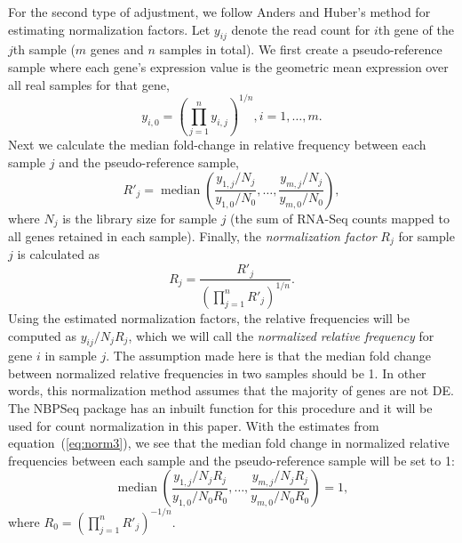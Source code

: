 \documentclass[letterpaper,12pt]{article}
\DeclareMathOperator{\median}{median}
\begin{document}
For the second type of adjustment, we follow Anders and Huber's method
\citep{anders2010differential} for 
estimating normalization factors.  Let $y_{ij}$ denote the read count
for $i$th gene of the $j$th sample ($m$ genes and $n$ samples in total). We first
create a pseudo-reference sample where each gene's expression value is the 
geometric mean expression over all real samples for that gene,
\begin{equation}
y_{i,0} = (\prod_{j=1}^ny_{i,j})^{1/n},  i=1, \ldots, m. 
\end{equation} 
Next we calculate the median fold-change in relative frequency between
each sample $j$ and the pseudo-reference sample,
\begin{equation}\label{eq:normfactors} 
R'_j = \median \left(\dfrac{y_{1,j}/N_j}{y_{1,0}/N_{0}}, \ldots, 
\dfrac{y_{m,j}/N_j}{y_{m,0}/N_{0}}\right),
\end{equation}
where $N_j$ is the library size for sample $j$ (the sum of RNA-Seq
counts mapped to all genes retained in each sample). Finally, the
\textit{normalization factor}  $R_j$ for sample $j$ is calculated as 
\begin{equation}
\label{eq:norm3}
R_j = \dfrac{R'_j}{(\prod_{j=1}^{n}R'_j)^{1/n}}.
\end{equation}
Using the estimated normalization factors, the relative frequencies will be
computed as $y_{ij}/{N_j R_j}$, which we will call the \textit{normalized relative frequency}
for gene $i$ in sample $j$. The assumption made here is that the
median fold change between normalized relative frequencies in two samples should be 1. In
other words, this normalization method assumes that the majority of genes are
not DE. The NBPSeq package \citep{di2014package} has an inbuilt function for
this procedure and it will be used for count normalization in this paper. With
the estimates from equation~(\ref{eq:norm3}), we see that the median fold
change in normalized relative frequencies between each sample and the pseudo-reference
sample will be set to 1:
\begin{equation}
\label{eq:medianfc}
\median \left(\dfrac{y_{1,j}/ N_jR_j}{y_{1,0}/N_{0}R_0}, \ldots,
\dfrac{y_{m,j}/N_j R_j}{y_{m,0}/N_{0}R_0} \right) = 1,
\end{equation}
where $R_0 = (\prod_{j=1}^{n}R'_j)^{-1/n}$.

\end{document}
